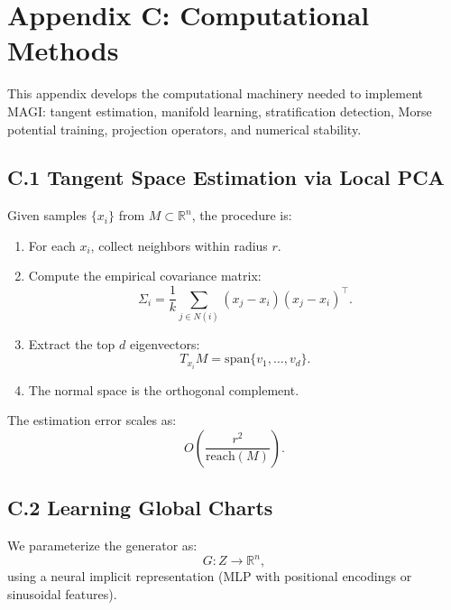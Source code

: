\documentclass[11pt,a4paper,twocolumn]{article}
\begin{document}

\section*{Appendix C: Computational Methods}

This appendix develops the computational machinery needed to implement
MAGI: tangent estimation, manifold learning, stratification detection,
Morse potential training, projection operators, and numerical stability.


\subsection*{C.1 Tangent Space Estimation via Local PCA}

Given samples $\{x_i\}$ from $M \subset \mathbb{R}^n$, the procedure is:

\begin{enumerate}
\item For each $x_i$, collect neighbors within radius $r$.
\item Compute the empirical covariance matrix:
\[
\Sigma_i = \frac{1}{k}\sum_{j \in N(i)}(x_j - x_i)(x_j - x_i)^{\top}.
\]
\item Extract the top $d$ eigenvectors:
\[
T_{x_i}M = \mathrm{span}\{v_1,\ldots,v_d\}.
\]
\item The normal space is the orthogonal complement.
\end{enumerate}

The estimation error scales as:
\[
O\!\left(\frac{r^2}{\mathrm{reach}(M)}\right).
\]


\subsection*{C.2 Learning Global Charts}

We parameterize the generator as:
\[
G : Z \to \mathbb{R}^n,
\]
using a neural implicit representation (MLP with positional encodings or
sinusoidal features).
\end{document}
